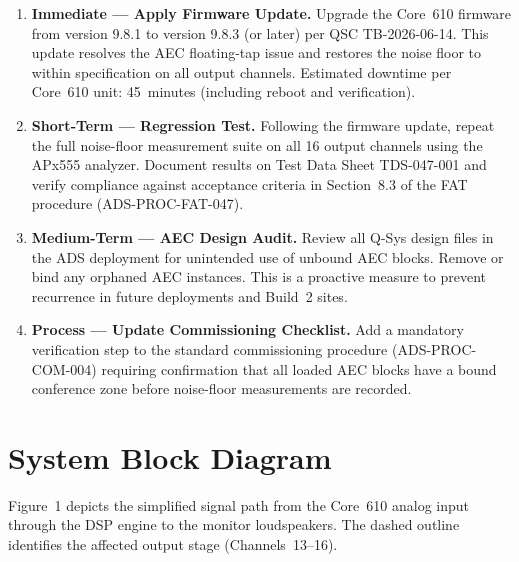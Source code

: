 \documentclass[11pt,letterpaper]{article}
\begin{document}
\begin{enumerate}[leftmargin=*, label=\textbf{R-\arabic*:}, ref=R-\arabic*, itemsep=6pt]

  \item \textbf{Immediate --- Apply Firmware Update.} Upgrade the Core~610
        firmware from version 9.8.1 to version 9.8.3 (or later) per QSC
        TB-2026-06-14. This update resolves the AEC floating-tap issue and
        restores the noise floor to within specification on all output
        channels. Estimated downtime per Core~610 unit: 45~minutes (including
        reboot and verification).

  \item \textbf{Short-Term --- Regression Test.} Following the firmware update,
        repeat the full noise-floor measurement suite on all 16 output channels
        using the APx555 analyzer. Document results on Test Data Sheet
        TDS-047-001 and verify compliance against acceptance criteria in
        Section~8.3 of the FAT procedure (ADS-PROC-FAT-047).

  \item \textbf{Medium-Term --- AEC Design Audit.} Review all Q-Sys design files
        in the ADS deployment for unintended use of unbound AEC blocks. Remove
        or bind any orphaned AEC instances. This is a proactive measure to
        prevent recurrence in future deployments and Build~2 sites.

  \item \textbf{Process --- Update Commissioning Checklist.} Add a mandatory
        verification step to the standard commissioning procedure
        (ADS-PROC-COM-004) requiring confirmation that all loaded AEC blocks
        have a bound conference zone before noise-floor measurements are
        recorded.

\end{enumerate}

\section{System Block Diagram}

Figure~1 depicts the simplified signal path from the Core~610 analog input
through the DSP engine to the monitor loudspeakers. The dashed outline
identifies the affected output stage (Channels~13--16).
\end{document}
